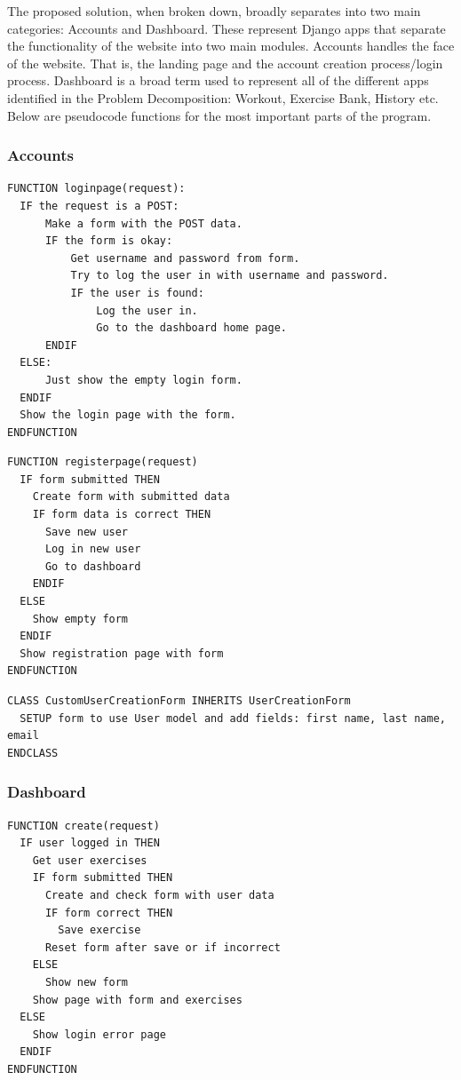 \documentclass{article}
\begin{document}
The proposed solution, when broken down, broadly separates into two main categories: Accounts and Dashboard. These represent Django apps that separate the functionality of the website into two main modules. Accounts handles the face of the website. That is, the landing page and the account creation process/login process. Dashboard is a broad term used to represent all of the different apps identified in the Problem Decomposition: Workout, Exercise Bank, History etc. Below are pseudocode functions for the most important parts of the program. 

\subsubsection{Accounts}

\begin{lstlisting}[style=OCRPseudocode, caption={Login Page}]
  FUNCTION loginpage(request):
  IF the request is a POST:
      Make a form with the POST data.
      IF the form is okay:
          Get username and password from form.
          Try to log the user in with username and password.
          IF the user is found:
              Log the user in.
              Go to the dashboard home page.
      ENDIF
  ELSE:
      Just show the empty login form.
  ENDIF
  Show the login page with the form.
ENDFUNCTION
\end{lstlisting}

\begin{lstlisting}[style=OCRPseudocode, caption={Register Page}]
  FUNCTION registerpage(request)
  IF form submitted THEN
    Create form with submitted data
    IF form data is correct THEN
      Save new user
      Log in new user
      Go to dashboard
    ENDIF
  ELSE
    Show empty form
  ENDIF
  Show registration page with form
ENDFUNCTION

\end{lstlisting}

\begin{lstlisting}[style=OCRPseudocode, caption={CustomUserCreationForm}]
  CLASS CustomUserCreationForm INHERITS UserCreationForm
  SETUP form to use User model and add fields: first name, last name, email
ENDCLASS
\end{lstlisting}

\subsubsection{Dashboard}

\begin{lstlisting}[style=OCRPseudocode, caption={Exercise Creation view}]
  FUNCTION create(request)
  IF user logged in THEN
    Get user exercises
    IF form submitted THEN
      Create and check form with user data
      IF form correct THEN
        Save exercise
      Reset form after save or if incorrect
    ELSE
      Show new form
    Show page with form and exercises
  ELSE
    Show login error page
  ENDIF
ENDFUNCTION

\end{lstlisting}
\end{document}
